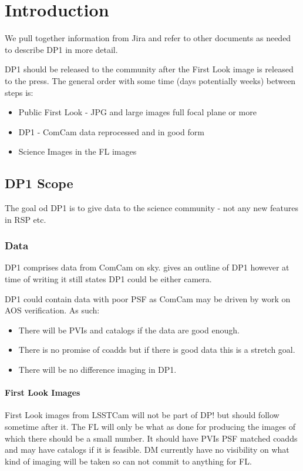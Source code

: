 \section{Introduction} \label{sec:intro}

We pull together information from Jira and refer to other documents as needed to describe DP1 in more detail.

DP1 should be released to the community after the First Look image is released to the press.
The general order with some time (days potentially weeks)  between steps is:

\begin{itemize}
\item Public First Look - JPG and large images full focal plane or more
\item DP1 - ComCam data reprocessed and in good form
\item Science Images in the FL images
\end{itemize}


\subsection{DP1 Scope} \label{sec:scope}
The goal od DP1 is to give data to the science community - not any new features in RSP etc.
\subsubsection{Data}
DP1 comprises data from ComCam on sky.
 gives an outline of DP1 however at time of writing it still states DP1 could be either camera.

DP1 could contain data with poor PSF as ComCam may be driven by work on AOS verification.
As such:
\begin{itemize}
\item There will be PVIs and catalogs if the data are good enough.
\item There is no promise of coadds but if there is good data this is a stretch goal.
\item There will be no difference imaging in DP1.
\end{itemize}

\paragraph{First Look Images} \label{sec:fl}

First Look images from LSSTCam will not be part of DP! but should follow sometime after it.
The FL will only be what as done for producing the images of which there should be a small number.
It should have PVIs PSF matched coadds  and  may have catalogs if it is feasible.
DM currently have no visibility on what kind of imaging will be taken so can not commit to anything for FL.

